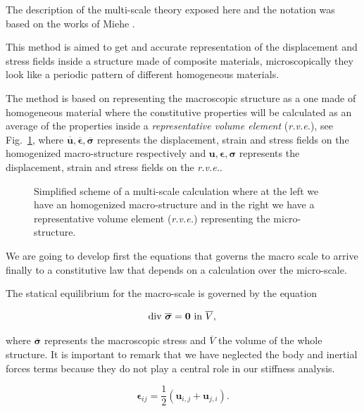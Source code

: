 \documentclass[3p]{elsarticle}
\begin{document}
The description of the multi-scale theory exposed here and the 
notation was based on the works of Miehe \cite{miehe2002}.

This method is aimed to get and accurate representation of the displacement 
and stress fields inside a structure made of composite materials, microscopically
they look like a periodic pattern of different homogeneous materials.

The method is based on representing the macroscopic structure as a one made of 
homogeneous material where the constitutive properties will be calculated as an 
average of the properties inside a \emph{representative volume element} (\emph{r.v.e.}),
see Fig.~\ref{fig:multi-scale}, where 
$\overline{\bm{u}}, \overline{\bm{\epsilon}}, \overline{\bm{\sigma}}$
represents the displacement, strain and stress fields on the homogenized
macro-structure respectively and
${\bm{u}}, {\bm{\epsilon}}, {\bm{\sigma}}$
represents the displacement, strain and stress fields on the \emph{r.v.e.}.

\begin{figure}[!ht]
\centering
\resizebox{8cm}{!}{}
\caption{\label{fig:multi-scale}Simplified scheme of a multi-scale calculation 
where at the left we have an homogenized macro-structure and 
in the right we have a representative volume element (\emph{r.v.e.}) 
representing the micro-structure.}
\end{figure}

We are going to develop first the equations that governs the macro scale
to arrive finally to a constitutive law that depends on a calculation over the
micro-scale.

The statical equilibrium for the macro-scale is governed by the equation

\begin{equation}
\text{div } \overline{\bm{\sigma}} = \bm{0} \text{ in } \overline{V},\\
\label{eq:macro_equil}
\end{equation}

\noindent
where $\overline{\bm{\sigma}}$ represents the macroscopic stress and
$\overline{V}$ the volume of the whole structure. It is important to remark that
we have neglected the body and inertial forces terms because they do not
play a central role in our stiffness analysis.

\begin{equation}
 \bm{\epsilon}_{ij} = \frac{1}{2}\left( \bm{u}_{i,j} + \bm{u}_{j,i} \right).
\label{eq:constitutive}
\end{equation}
\end{document}
